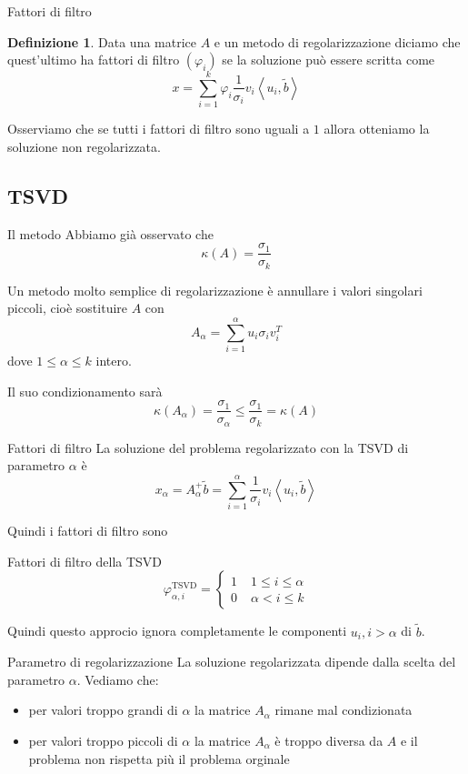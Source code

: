 \documentclass{beamer}
\newcounter{counter1}
\theoremstyle{plain}
\theoremstyle{definition}
\newtheorem{mydef}[counter1]{Definizione}
\theoremstyle{remark}
\newcommand{\pa}[1]{\left(#1\right)}
\newcommand{\ang}[1]{\left<#1\right>}
\begin{document}
\begin{frame}{Fattori di filtro}
  \begin{mydef}
    Data una matrice $A$ e un metodo di regolarizzazione diciamo che
    quest'ultimo ha fattori di filtro $\pa{\varphi _i}$ se la
    soluzione può essere scritta come
    \[ x = \sum _{i=1} ^k \varphi _i \frac{1}{\sigma _i} v_i
    \ang{u_i,\tilde b} \]
  \end{mydef}

  Osserviamo che se tutti i fattori di filtro sono uguali a $1$ allora
  otteniamo la soluzione non regolarizzata.
\end{frame}

\subsection{TSVD}

\begin{frame}{Il metodo}
  Abbiamo già osservato che
  \[ \kappa (A) = \frac{\sigma _1}{\sigma _k} \]
  
  Un metodo molto semplice di regolarizzazione è annullare i valori
  singolari piccoli, cioè sostituire $A$ con
  \[ A_\alpha = \sum _{i=1} ^\alpha u_i \sigma _i v_i ^T \]
  dove $1\le \alpha \le k$ intero.
  \vfill
  
  Il suo condizionamento sarà
  \[ \kappa (A_\alpha) = \frac{\sigma _1}{\sigma _\alpha} \le
  \frac{\sigma _1}{\sigma _k} = \kappa(A) \]
\end{frame}

\begin{frame}{Fattori di filtro}
  La soluzione del problema regolarizzato con la TSVD di parametro
  $\alpha$ è
  \[ x_\alpha = A_\alpha ^+ \tilde b = \sum _{i=1} ^\alpha
  \frac{1}{\sigma _i} v_i \ang{u_i,\tilde b} \]
  \vfill

  Quindi i fattori di filtro sono
  \begin{block}{Fattori di filtro della TSVD}
  \[ \varphi ^{\text{TSVD}}_{\alpha,i} = \left\{
    \begin{matrix}
      1 \; &1\le i \le \alpha\\
      0 \; &\alpha < i \le k
    \end{matrix}
    \right. \]
  \end{block}
  \vfill
  
  Quindi questo approcio ignora completamente le componenti $u_i,
  i>\alpha$ di $\tilde b$.
\end{frame}

\begin{frame}{Parametro di regolarizzazione}
  La soluzione regolarizzata dipende dalla scelta del parametro
  $\alpha$. Vediamo che:
  \begin{itemize}
  \item per valori troppo grandi di $\alpha$ la matrice $A_\alpha$
    rimane mal condizionata
  \item per valori troppo piccoli di $\alpha$ la matrice $A_\alpha$ è
    troppo diversa da $A$ e il problema non rispetta più il problema
    orginale
  \end{itemize}
\end{frame}
\end{document}
